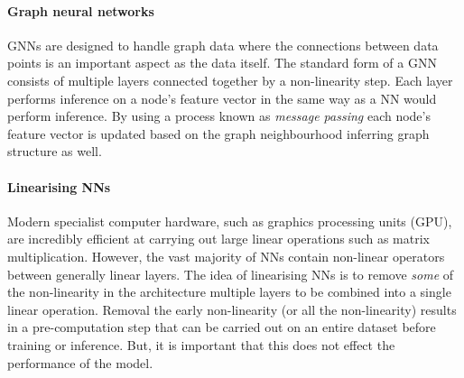 \paragraph{Graph neural networks} 
GNNs are designed to handle graph data where the connections between data points is an important aspect as the data itself.
The standard form of a GNN  consists of multiple layers connected together by a non-linearity step.
Each layer performs inference on a node's feature vector in the same way as a NN would perform inference.
By using a process known as \emph{message passing} each node's feature vector is updated based on the graph neighbourhood inferring graph structure as well.



\paragraph{Linearising NNs}
Modern specialist computer hardware, such as graphics processing units (GPU), are incredibly efficient at carrying out large linear operations such as matrix multiplication.
However, the vast majority of NNs contain non-linear operators between generally linear layers.
The idea of linearising NNs is to remove \emph{some} of the non-linearity in the architecture multiple layers to be combined into a single linear operation.
Removal the early non-linearity (or all the non-linearity) results in a pre-computation step that can be carried out on an entire dataset before training or inference.
But, it is important that this does not effect the performance of the model.

